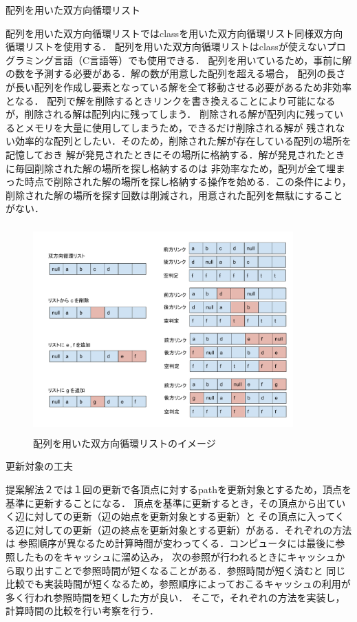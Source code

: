 \documentclass[12pt]{optlab-bachelor}
\begin{document}
\begin{description}
  \item[配列を用いた双方向循環リスト]
\end{description}

配列を用いた双方向循環リストではclassを用いた双方向循環リスト同様双方向循環リストを使用する．
配列を用いた双方向循環リストはclassが使えないプログラミング言語（C言語等）でも使用できる．
配列を用いているため，事前に解の数を予測する必要がある．解の数が用意した配列を超える場合，
配列の長さが長い配列を作成し要素となっている解を全て移動させる必要があるため非効率となる．
配列で解を削除するときリンクを書き換えることにより可能になるが，削除される解は配列内に残ってしまう．
削除される解が配列内に残っているとメモリを大量に使用してしまうため，できるだけ削除される解が
残されない効率的な配列としたい．そのため，削除された解が存在している配列の場所を記憶しておき
解が発見されたときにその場所に格納する．解が発見されたときに毎回削除された解の場所を探し格納するのは
非効率なため，配列が全て埋まった時点で削除された解の場所を探し格納する操作を始める．この条件により，
削除された解の場所を探す回数は削減され，用意された配列を無駄にすることがない．

\begin{figure}[htbp]
  \centering
  \caption{配列を用いた双方向循環リストのイメージ}
  \includegraphics[height=8.0cm, width=10.0cm]{fig/fig11.pdf}
\end{figure}

\begin{description}
  \item[更新対象の工夫]
\end{description}

提案解法２では１回の更新で各頂点に対するpathを更新対象とするため，頂点を基準に更新することになる．
頂点を基準に更新するとき，その頂点から出ていく辺に対しての更新（辺の始点を更新対象とする更新）と
その頂点に入ってくる辺に対しての更新（辺の終点を更新対象とする更新）がある．それぞれの方法は
参照順序が異なるため計算時間が変わってくる．コンピュータには最後に参照したものをキャッシュに溜め込み，
次の参照が行われるときにキャッシュから取り出すことで参照時間が短くなることがある．参照時間が短く済むと
同じ比較でも実装時間が短くなるため，参照順序によっておこるキャッシュの利用が多く行われ参照時間を短くした方が良い．
そこで，それぞれの方法を実装し，計算時間の比較を行い考察を行う．
\end{document}
